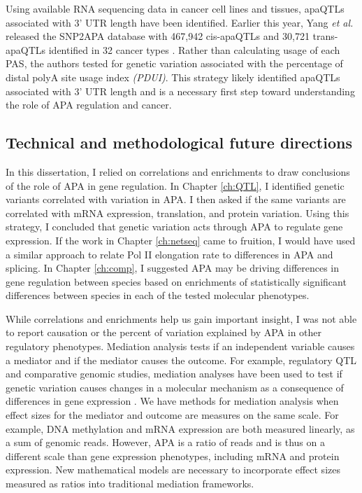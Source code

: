  
Using available RNA sequencing data in cancer cell lines and tissues, apaQTLs associated with 3' UTR length have been identified. Earlier this year, Yang \emph{et al.} released the SNP2APA database with 467,942 cis-apaQTLs and 30,721 trans-apaQTLs identified in 32 cancer types \citep{yang_snp2apa_2020}. Rather than calculating usage of each PAS, the authors tested for genetic variation associated with the percentage of distal polyA site usage index \emph{(PDUI)}. This strategy likely identified apaQTLs associated with 3' UTR length and is a necessary first step toward understanding the role of APA regulation and cancer. 



\subsection{Technical and methodological future directions}

In this dissertation, I relied on correlations and enrichments to draw conclusions of the role of APA in gene regulation. In Chapter \ref{ch:QTL}, I identified genetic variants correlated with variation in APA. I then asked if the same variants are correlated with mRNA expression, translation, and protein variation. Using this strategy, I concluded that genetic variation acts through APA to regulate gene expression. If the work in Chapter \ref{ch:netseq} came to fruition, I would have used a similar approach to relate Pol II elongation rate to differences in APA and splicing. In Chapter \ref{ch:comp}, I suggested APA may be driving differences in gene regulation between species based on enrichments of statistically significant differences between species in each of the tested molecular phenotypes. 

While correlations and enrichments help us gain important insight, I was not able to report causation or the percent of variation explained by APA in other regulatory phenotypes. Mediation analysis tests if an independent variable causes a mediator and if the mediator causes the outcome. For example, regulatory QTL and comparative genomic studies, mediation analyses have been used to test if genetic variation causes changes in a molecular mechanism as a consequence of differences in gene expression \citep{pierce_co-occurring_2018, park_bayesian_2017, blake_comparison_2020, eres_reorganization_2019}. We have methods for mediation analysis when effect sizes for the mediator and outcome are measures on the same scale. For example, DNA methylation and mRNA expression are both measured linearly, as a sum of genomic reads. However, APA is a ratio of reads and is thus on a different scale than gene expression phenotypes, including mRNA and protein expression. New mathematical models are necessary to incorporate effect sizes measured as ratios into traditional mediation frameworks. 


